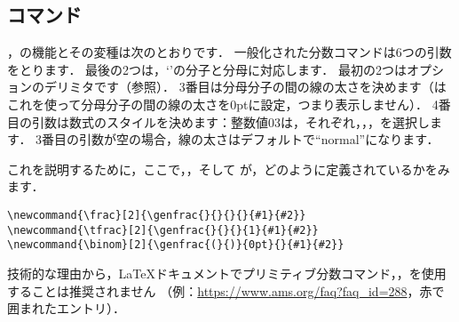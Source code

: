 \subsection{コマンド}

，の機能とその変種は次のとおりです．
一般化された分数コマンドは6つの引数をとります．
最後の2つは，`'の分子と分母に対応します．
最初の2つはオプションのデリミタです（参照）．
3番目は分母分子の間の線の太さを決めます（はこれを使って分母分子の間の線の太さを0ptに設定，つまり表示しません）．
4番目の引数は数式のスタイルを決めます：整数値0\ndash 3は，それぞれ，，，を選択します．
3番目の引数が空の場合，線の太さはデフォルトで``normal''になります．

\begin{cmdspec}[25em]
\string\genfrac {}  
  
\end{cmdspec}
これを説明するために，ここで，，そして
が，どのように定義されているかをみます．
\begin{verbatim}
\newcommand{\frac}[2]{\genfrac{}{}{}{}{#1}{#2}}
\newcommand{\tfrac}[2]{\genfrac{}{}{}{1}{#1}{#2}}
\newcommand{\binom}[2]{\genfrac{(}{)}{0pt}{}{#1}{#2}}
\end{verbatim}

\begin{notes}
\singlenote 技術的な理由から，\LaTeX{}ドキュメントでプリミティブ分数コマンド，，を使用することは推奨されません
（例：\url{https://www.ams.org/faq?faq\_id=288}，赤で囲まれたエントリ）．
\end{notes}

